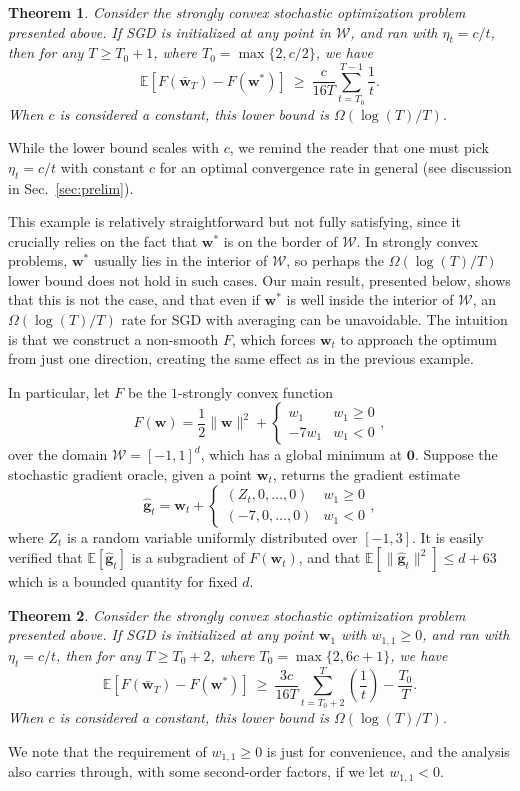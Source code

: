 \documentclass{article}
\newtheorem{theorem}{Theorem}
\newcommand{\E}{\mathbb{E}}
\newcommand{\bw}{\mathbf{w}}
\newcommand{\bg}{\mathbf{g}}
\newcommand{\Wcal}{\mathcal{W}}
\newcommand{\norm}[1]{\|#1\|}
\newcommand{\secref}[1]{Sec.~\ref{#1}}
\begin{document}
\begin{theorem}\label{thm:simple}
Consider the strongly convex stochastic optimization problem presented above. If SGD is initialized at any point in $\Wcal$, and ran with $\eta_t = c/t$, then for any $T\geq T_0+1$, where $T_0=\max\{2,c/2\}$, we have
\[
\E[F(\bar{\bw}_{T})-F(\bw^{*})] ~\geq~\frac{c}{16T}\sum_{t=T_0}^{T-1}\frac{1}{t}.
\]
When $c$ is considered a constant, this lower bound is $\Omega(\log(T)/T)$.
\end{theorem}
While the lower bound scales with $c$, we remind the reader that one must pick $\eta_t=c/t$ with constant $c$ for an optimal convergence rate in general (see discussion in \secref{sec:prelim}).

This example is relatively straightforward but not fully satisfying, since it crucially relies on the fact that $\bw^*$ is on the border of $\Wcal$. In strongly convex problems, $\bw^*$ usually lies in the interior of $\Wcal$, so perhaps the $\Omega(\log(T)/T)$ lower bound does not hold in such cases. Our main result, presented below, shows that this is not the case, and that even if $\bw^*$ is well inside the interior of $\Wcal$, an $\Omega(\log(T)/T)$ rate for SGD with averaging can be unavoidable. The intuition is that we construct a non-smooth $F$, which forces $\bw_t$ to approach the optimum from just one direction, creating the same effect as in the previous example.

In particular, let $F$ be the $1$-strongly convex function
\[
F(\bw) = \frac{1}{2}\norm{\bw}^2+\begin{cases} w_1 & w_1\geq 0 \\ -7w_1 & w_1<0\end{cases},
\]
over the domain $\Wcal=[-1,1]^d$, which has a global minimum at $\mathbf{0}$. Suppose the stochastic gradient oracle, given a point $\bw_t$, returns the gradient estimate
\[
\hat{\bg}_t = \bw_t+\begin{cases} (Z_t,0,\ldots,0) & w_1 \geq 0 \\ (-7,0,\ldots,0) & w_1<0\end{cases},
\]
where $Z_t$ is a random variable uniformly distributed over $[-1,3]$. It is easily verified that $\E[\hat{\bg}_t]$ is a subgradient of $F(\bw_t)$, and that $\E[\norm{\hat{\bg}_t}^2]\leq d+63$ which is a bounded quantity for fixed $d$.

\begin{theorem}\label{thm:involved}
Consider the strongly convex stochastic optimization problem presented above. If SGD is initialized at any point $\bw_1$ with $w_{1,1}\geq 0$, and ran with $\eta_t = c/t$, then for any $T\geq T_0+2$, where $T_0=\max\{2,6c+1\}$, we have
\[
\E\left[F(\bar{\bw}_{T})-F(\bw^{*})\right] ~\geq~\frac{3c}{16 T}\sum_{t=T_0+2}^{T}\left(\frac{1}{t}\right)-\frac{T_0}{T}.
\]
When $c$ is considered a constant, this lower bound is $\Omega(\log(T)/T)$.
\end{theorem}
We note that the requirement of $w_{1,1}\geq 0$ is just for convenience, and the analysis also carries through, with some second-order factors, if we let $w_{1,1}<0$.
\end{document}
